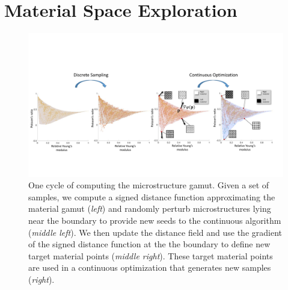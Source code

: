 \section{Material Space Exploration}
\label{sec:sampling}
\begin{figure}
	\centering
	\includegraphics[width=.95\linewidth]{figs/topsampling.pdf}
	\caption{One cycle of computing the microstructure gamut. 
		Given a set of samples, we compute a signed distance function approximating the material gamut (\emph{left}) and randomly perturb microstructures lying near the boundary to provide new seeds to the continuous algorithm (\emph{middle left}). We then update the distance field and use the gradient of the signed distance function at the the boundary to define new target material points (\emph{middle right}). These target material points are used in a continuous optimization that generates new samples (\emph{right}).} 
	\label{fig:lssampling}
\end{figure}

